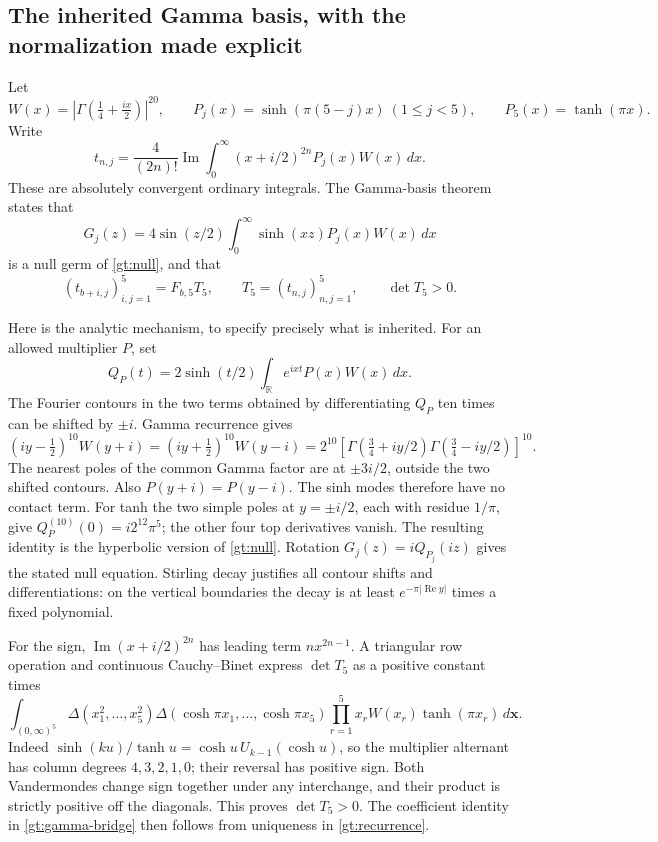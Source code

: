 \subsection{The inherited Gamma basis, with the normalization made explicit}

Let
\[
 W(x)=\left|\Gamma\!\left(\tfrac14+\tfrac{ix}{2}\right)\right|^{20},
 \qquad
 P_j(x)=\sinh(\pi(5-j)x)\ (1\le j<5),\qquad
 P_5(x)=\tanh(\pi x).
\]
Write
\begin{equation}\label{gt:t}
 t_{n,j}=\frac4{(2n)!}\operatorname{Im}
                  \int_0^\infty(x+i/2)^{2n}P_j(x)W(x)\,dx.
\end{equation}
These are absolutely convergent ordinary integrals. The Gamma-basis
theorem \cite{OrderedBoundary} states that
\[
 G_j(z)=4\sin(z/2)\int_0^\infty\sinh(xz)P_j(x)W(x)\,dx
\]
is a null germ of \eqref{gt:null}, and that
\begin{equation}\label{gt:gamma-bridge}
 (t_{b+i,j})_{i,j=1}^{5}=F_{b,5}T_5,
 \qquad T_5=(t_{n,j})_{n,j=1}^{5},\qquad \det T_5>0.
\end{equation}

Here is the analytic mechanism, to specify precisely what is inherited.
For an allowed multiplier $P$, set
\[
 Q_P(t)=2\sinh(t/2)\int_{\mathbb R}e^{ixt}P(x)W(x)\,dx.
\]
The Fourier contours in the two terms obtained by differentiating
$Q_P$ ten times can be shifted by $\pm i$. Gamma recurrence gives
\[
 (iy-\tfrac12)^{10}W(y+i)
 =(iy+\tfrac12)^{10}W(y-i)
 =2^{10}\left[
    \Gamma(\tfrac34+iy/2)\Gamma(\tfrac34-iy/2)\right]^{10}.
\]
The nearest poles of the common Gamma factor are at $\pm3i/2$,
outside the two shifted contours. Also $P(y+i)=P(y-i)$.
The sinh modes therefore have no contact term. For tanh the two
simple poles at $y=\pm i/2$, each with residue $1/\pi$, give
$Q_P^{(10)}(0)=i2^{12}\pi^5$; the other four top derivatives vanish.
The resulting identity is the hyperbolic version of
\eqref{gt:null}. Rotation $G_j(z)=iQ_{P_j}(iz)$ gives the stated
null equation. Stirling decay justifies all contour shifts and
differentiations: on the vertical boundaries the decay is at least
$e^{-\pi|\operatorname{Re}y|}$ times a fixed polynomial.

For the sign, $\operatorname{Im}(x+i/2)^{2n}$ has leading term
$nx^{2n-1}$. A triangular row operation and continuous Cauchy--Binet
express $\det T_5$ as a positive constant times
\[
 \int_{(0,\infty)^5}
 \Delta(x_1^2,\ldots,x_5^2)
 \Delta(\cosh\pi x_1,\ldots,\cosh\pi x_5)
 \prod_{r=1}^{5}x_rW(x_r)\tanh(\pi x_r)\,d\mathbf x.
\]
Indeed $\sinh(ku)/\tanh u=\cosh u\,U_{k-1}(\cosh u)$,
so the multiplier alternant has column degrees $4,3,2,1,0$;
their reversal has positive sign. Both Vandermondes change sign
together under any interchange, and their product is strictly
positive off the diagonals. This proves $\det T_5>0$.
The coefficient identity in \eqref{gt:gamma-bridge} then follows
from uniqueness in \eqref{gt:recurrence}.

